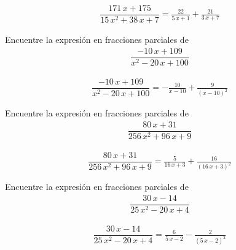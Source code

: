 \begin{align*}
	\dfrac{171 \, x + 175}{15 \, x^{2} + 38 \, x + 7}= \frac{22}{5 \, x + 1} + \frac{21}{3 \, x + 7}
\end{align*}



{}
\begin{problema}
	Encuentre la expresión en fracciones parciales de
	\begin{align*}
		\dfrac{-10 \, x + 109}{x^{2} - 20 \, x + 100}
	\end{align*}
\end{problema}

\begin{align*}
	\dfrac{-10 \, x + 109}{x^{2} - 20 \, x + 100}= -\frac{10}{x - 10} + \frac{9}{{\left(x - 10\right)}^{2}}
\end{align*}


{}
\begin{problema}
	Encuentre la expresión en fracciones parciales de
	\begin{align*}
		\dfrac{80 \, x + 31}{256 \, x^{2} + 96 \, x + 9}
	\end{align*}
\end{problema}

\begin{align*}
	\dfrac{80 \, x + 31}{256 \, x^{2} + 96 \, x + 9}= \frac{5}{16 \, x + 3} + \frac{16}{{\left(16 \, x + 3\right)}^{2}}
\end{align*}


{}
\begin{problema}
	Encuentre la expresión en fracciones parciales de
	\begin{align*}
		\dfrac{30 \, x - 14}{25 \, x^{2} - 20 \, x + 4}
	\end{align*}
\end{problema}

\begin{align*}
	\dfrac{30 \, x - 14}{25 \, x^{2} - 20 \, x + 4}= \frac{6}{5 \, x - 2} - \frac{2}{{\left(5 \, x - 2\right)}^{2}}
\end{align*}


